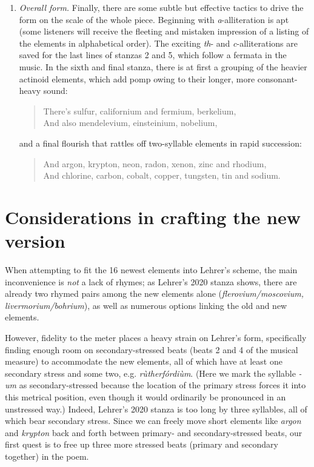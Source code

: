 \documentclass{article}
\begin{document}
\begin{enumerate}
  \item \emph{Overall form.} Finally, there are some subtle but effective tactics to drive the form on the scale of the whole piece. Beginning with \emph{a}-alliteration is apt (some listeners will receive the fleeting and mistaken impression of a listing of the elements in alphabetical order). The exciting \emph{th}- and \emph{c}-alliterations are saved for the last lines of stanzas 2 and 5, which follow a fermata in the music. In the sixth and final stanza, there is at first a grouping of the heavier actinoid elements, which add pomp owing to their longer, more consonant-heavy sound:
  \begin{verse}
    There's sulfur, californium and fermium, berkelium,\\
    And also mendelevium, einsteinium, nobelium,
  \end{verse}
  and a final flourish that rattles off two-syllable elements in rapid succession:
  \begin{verse}
    And argon, krypton, neon, radon, xenon, zinc and rhodium,\\
    And chlorine, carbon, cobalt, copper, tungsten, tin and sodium.
  \end{verse}
\end{enumerate}

\section{Considerations in crafting the new version}
When attempting to fit the 16 newest elements into Lehrer's scheme, the main inconvenience is \emph{not} a lack of rhymes; as Lehrer's 2020 stanza shows, there are already two rhymed pairs among the new elements alone (\emph{flerovium/moscovium, livermorium/bohrium}), as well as numerous options linking the old and new elements.

However, fidelity to the meter places a heavy strain on Lehrer's form, specifically finding enough room on secondary-stressed beats (beats 2 and 4 of the musical measure) to accommodate the new elements, all of which have at least one secondary stress and some two, e.g. \emph{r\`utherf\'ordi\`um}. (Here we mark the syllable \emph{-um} as secondary-stressed because the location of the primary stress forces it into this metrical position, even though it would ordinarily be pronounced in an unstressed way.) Indeed, Lehrer's 2020 stanza is too long by three syllables, all of which bear secondary stress. Since we can freely move short elements like \emph{argon} and \emph{krypton} back and forth between primary- and secondary-stressed beats, our first quest is to free up three more stressed beats (primary and secondary together) in the poem.
\end{document}
